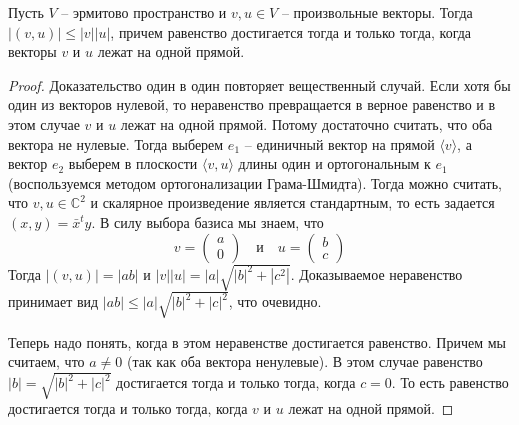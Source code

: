 \begin{claim}
Пусть $V$ -- эрмитово пространство и $v,u\in V$ -- произвольные векторы. Тогда $|(v,u)|\leqslant |v| |u|$, причем равенство достигается тогда и только тогда, когда векторы $v$ и $u$ лежат на одной прямой.
\end{claim}
\begin{proof}
Доказательство один в один повторяет вещественный случай. Если хотя бы один из векторов нулевой, то неравенство превращается в верное равенство и в этом случае $v$ и $u$ лежат на одной прямой. Потому достаточно считать, что оба вектора не нулевые. Тогда выберем $e_1$ -- единичный вектор на прямой $\langle v\rangle$, а вектор $e_2$ выберем в плоскости $\langle v, u \rangle$ длины один и ортогональным к $e_1$ (воспользуемся методом ортогонализации Грама-Шмидта). Тогда можно считать, что $v,u\in \mathbb C^2$ и скалярное произведение является стандартным, то есть задается $(x, y) = \bar x^t y$. В силу выбора базиса мы знаем, что 
\[
v=
\begin{pmatrix}
{a}\\{0}
\end{pmatrix}
\quad \text{и} \quad
u =
\begin{pmatrix}
{b}\\{c}
\end{pmatrix}
\]
Тогда $|(v,u)| = |ab|$ и $|v||u| = |a|\sqrt{|b|^2 + |c^2|}$. Доказываемое неравенство принимает вид $|ab|\leqslant |a|\sqrt{|b|^2+|c|^2}$, что очевидно.

Теперь надо понять, когда в этом неравенстве достигается равенство. Причем мы считаем, что $a\neq 0 $ (так как оба вектора ненулевые). В этом случае равенство $|b| = \sqrt{|b|^2+|c|^2}$ достигается тогда и только тогда, когда $c = 0$. То есть равенство достигается тогда и только тогда, когда $ v$ и $u$ лежат на одной прямой.
\end{proof}

